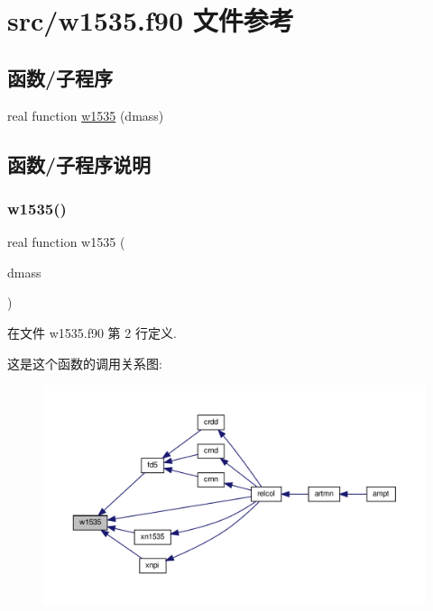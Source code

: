 \hypertarget{w1535_8f90}{}\section{src/w1535.f90 文件参考}
\label{w1535_8f90}
\subsection*{函数/子程序}
\begin{DoxyCompactItemize}
\item 
real function \mbox{\hyperlink{w1535_8f90_a8befd6b45a3e1db7d6d24730c9132ae1}{w1535}} (dmass)
\end{DoxyCompactItemize}


\subsection{函数/子程序说明}
\mbox{\label{w1535_8f90_a8befd6b45a3e1db7d6d24730c9132ae1}} 
\subsubsection{\texorpdfstring{w1535()}{w1535()}}
{\footnotesize\ttfamily real function w1535 (\begin{DoxyParamCaption}\item[{}]{dmass }\end{DoxyParamCaption})}



在文件 w1535.\+f90 第 2 行定义.

这是这个函数的调用关系图\+:
\nopagebreak
\begin{figure}[H]
\begin{center}
\leavevmode
\includegraphics[width=350pt]{w1535_8f90_a8befd6b45a3e1db7d6d24730c9132ae1_icgraph}
\end{center}
\end{figure}
